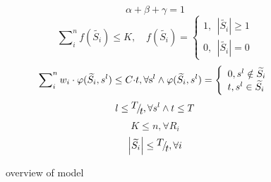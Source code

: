 \documentclass[conference,compsoc]{IEEEtran}
\begin{document}
\begin{equation}
\alpha  + \beta  + \gamma  = 1
\end{equation}
\begin{equation}
\sum\nolimits_i^n {f(\widetilde {{S_i}}) \le } K,\quad f(\widetilde {{S_i}}) = \left\{ \begin{array}{l}
1,\ \ \left| {\widetilde {{S_i}}} \right| \ge 1\\
0,\ \ \left| {\widetilde {{S_i}}} \right| = 0
\end{array} \right.
\end{equation}
\begin{equation}
\sum\nolimits_i^n {{w_i} \cdot \varphi (\widetilde {{S_i}},{s^l}) \le C \cdot } t,{\rm{  }}\forall {{\rm{s}}^l} \wedge \varphi (\widetilde {{S_i}},{s^l}) = \left\{ \begin{array}{l}
0,{s^l} \notin \widetilde {{S_i}}\\
t,{s^l} \in \widetilde {{S_i}}
\end{array} \right.
\end{equation}
\begin{equation}
l \le {\raise0.7ex\hbox{$T$} \!\mathord{\left/
 {\vphantom {T t}}\right.\kern-\nulldelimiterspace}
\!\lower0.7ex\hbox{$t$}},\forall {s^l} \wedge t \le T
\end{equation}
\begin{equation}
K \le n,\forall {R_i}
\end{equation}
\begin{equation}
\left| {\widetilde {{S_i}}} \right| \le {\raise0.7ex\hbox{$T$} \!\mathord{\left/
 {\vphantom {T t}}\right.\kern-\nulldelimiterspace}
\!\lower0.7ex\hbox{$t$}},\forall i
\end{equation}

\begin{figure}[!!!!!!!!!!!!!!hhhhhhhhhht]
\centering
{}
\caption{overview of model}
\label{fig_1_model}
\end{figure}
\end{document}
